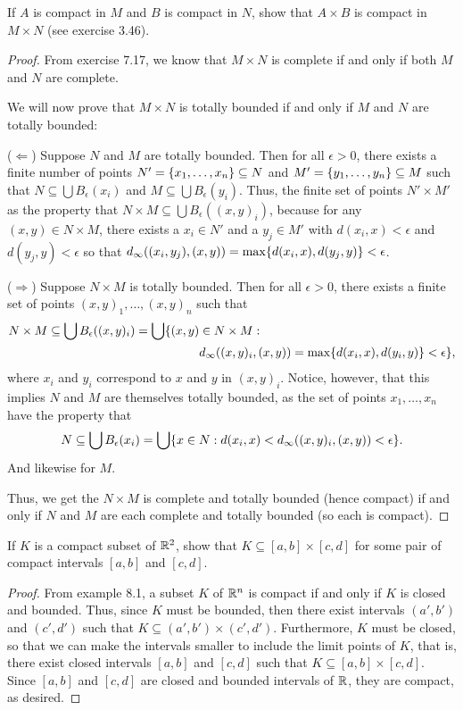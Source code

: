 \begin{exercise}{6}
If $A$ is compact in $M$ and $B$ is compact in $N$, show that $A\times B$ is compact in $M\times N$ (see exercise 3.46).
\end{exercise}
\begin{proof}
From exercise 7.17, we know that $M\times N$ is complete if and only if both $M$ and $N$ are complete. 

We will now prove that $M\times N$ is totally bounded if and only if $M$ and $N$ are totally bounded:

($\Leftarrow$)
Suppose $N$ and $M$ are totally bounded.
Then for all $\epsilon>0$, there exists a finite number of points $N'=\{x_1,\dots,x_n\}\subseteq N$ and $M'=\{y_1,\dots,y_n\}\subseteq M$ such that $N\subseteq\bigcup B_\epsilon(x_i)$ and $M\subseteq\bigcup B_\epsilon(y_i)$.
Thus, the finite set of points $N'\times M'$ as the property that $N\times M\subseteq\bigcup B_\epsilon((x,y)_i)$, because for any $(x,y)\in N\times M$, there exists a $x_i\in N'$ and a $y_j\in M'$ with $d(x_i,x)<\epsilon$ and $d(y_j,y)<\epsilon$ so that $d_\infty((x_i,y_j), (x,y)) = \max\{d(x_i,x), d(y_j,y)\}<\epsilon$.

($\Rightarrow$)
Suppose $N\times M$ is totally bounded.
Then for all $\epsilon>0$, there exists a finite set of points $(x,y)_1,\dots, (x,y)_n$ such that 
\begin{align*}
    N\times M
    \subseteq\bigcup B_\epsilon((x,y)_i) 
    = \bigcup \{(x,y) &\in N\times M:\\
    &d_\infty((x,y)_i, (x,y)) 
    = \max\{d(x_i,x),d(y_i,y)\} 
    <\epsilon\},
\end{align*}
where $x_i$ and $y_i$ correspond to $x$ and $y$ in $(x,y)_i$.
Notice, however, that this implies $N$ and $M$ are themselves totally bounded, as the set of points $x_1,\dots,x_n$ have the property that 
\begin{align*}
    N\subseteq\bigcup B_\epsilon(x_i) = \bigcup \{x\in N: d(x_i,x) < d_\infty((x,y)_i, (x,y)) < \epsilon\}.    
\end{align*}
And likewise for $M$.

Thus, we get the $N\times M$ is complete and totally bounded (hence compact) if and only if $N$ and $M$ are each complete and totally bounded (so each is compact).
\end{proof} 

\begin{exercise}{7}
If $K$ is a compact subset of $\mathbb{R}^2$, show that $K\subseteq [a,b]\times[c,d]$ for some pair of compact intervals $[a,b]$ and $[c,d]$.
\end{exercise}
\begin{proof}
From example 8.1, a subset $K$ of $\mathbb{R}^n$ is compact if and only if $K$ is closed and bounded.
Thus, since $K$ must be bounded, then there exist intervals $(a',b')$ and $(c',d')$ such that $K\subseteq (a',b')\times (c',d')$.
Furthermore, $K$ must be closed, so that we can make the intervals smaller to include the limit points of $K$, that is, there exist closed intervals $[a,b]$ and $[c,d]$ such that $K\subseteq [a,b]\times[c,d]$.
Since $[a,b]$ and $[c,d]$ are closed and bounded intervals of $\mathbb{R}$, they are compact, as desired.
\end{proof} 

